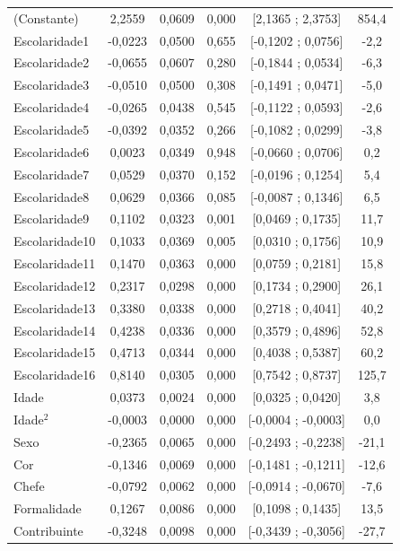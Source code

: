 \documentclass[12pt,a4paper,header]{abnt}
\begin{document}
\begin{center}
\begin{longtable}{lccccc}
(Constante) & 2,2559 & 0,0609 & 0,000 & [2,1365 ; 2,3753] & 854,4 \\
Escolaridade1 & -0,0223 & 0,0500 & 0,655 & [-0,1202 ; 0,0756] & -2,2 \\
Escolaridade2 & -0,0655 & 0,0607 & 0,280 & [-0,1844 ; 0,0534] & -6,3 \\
Escolaridade3 & -0,0510 & 0,0500 & 0,308 & [-0,1491 ; 0,0471] & -5,0 \\
Escolaridade4 & -0,0265 & 0,0438 & 0,545 & [-0,1122 ; 0,0593] & -2,6 \\
Escolaridade5 & -0,0392 & 0,0352 & 0,266 & [-0,1082 ; 0,0299] & -3,8 \\
Escolaridade6 & 0,0023 & 0,0349 & 0,948 & [-0,0660 ; 0,0706] & 0,2 \\
Escolaridade7 & 0,0529 & 0,0370 & 0,152 & [-0,0196 ; 0,1254] & 5,4 \\
Escolaridade8 & 0,0629 & 0,0366 & 0,085 & [-0,0087 ; 0,1346] & 6,5 \\
Escolaridade9 & 0,1102 & 0,0323 & 0,001 & [0,0469 ; 0,1735] & 11,7 \\
Escolaridade10 & 0,1033 & 0,0369 & 0,005 & [0,0310 ; 0,1756] & 10,9 \\
Escolaridade11 & 0,1470 & 0,0363 & 0,000 & [0,0759 ; 0,2181] & 15,8 \\
Escolaridade12 & 0,2317 & 0,0298 & 0,000 & [0,1734 ; 0,2900] & 26,1 \\
Escolaridade13 & 0,3380 & 0,0338 & 0,000 & [0,2718 ; 0,4041] & 40,2 \\
Escolaridade14 & 0,4238 & 0,0336 & 0,000 & [0,3579 ; 0,4896] & 52,8 \\
Escolaridade15 & 0,4713 & 0,0344 & 0,000 & [0,4038 ; 0,5387] & 60,2 \\
Escolaridade16 & 0,8140 & 0,0305 & 0,000 & [0,7542 ; 0,8737] & 125,7 \\
Idade & 0,0373 & 0,0024 & 0,000 & [0,0325 ; 0,0420] & 3,8 \\
Idade$^2$ & -0,0003 & 0,0000 & 0,000 & [-0,0004 ; -0,0003] & 0,0 \\
Sexo & -0,2365 & 0,0065 & 0,000 & [-0,2493 ; -0,2238] & -21,1 \\
Cor & -0,1346 & 0,0069 & 0,000 & [-0,1481 ; -0,1211] & -12,6 \\
Chefe & -0,0792 & 0,0062 & 0,000 & [-0,0914 ; -0,0670] & -7,6 \\
Formalidade & 0,1267 & 0,0086 & 0,000 & [0,1098 ; 0,1435] & 13,5 \\
Contribuinte & -0,3248 & 0,0098 & 0,000 & [-0,3439 ; -0,3056] & -27,7 \\

\end{longtable}
\end{center}
\end{document}
